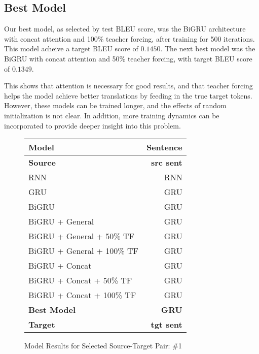 \documentclass[twoside,twocolumn]{article}
\begin{document}
\subsection{Best Model}
Our best model, as selected by test BLEU score, was the BiGRU architecture
with concat attention and 100\% teacher forcing, after training for 500
iterations. This model acheive a target BLEU score of $0.1450$. The next best
model was the BiGRU with concat attention and 50\% teacher forcing, with target
BLEU score of $0.1349$.

This shows that attention is necessary for good results, and that teacher
forcing helps the model achieve better translations by feeding in the true
target tokens. However, these models can be trained longer, and the effects
of random initialization is not clear. In addition, more training dynamics can
be incorporated to provide deeper insight into this problem.

\label{sec:results}

\begin{figure*}
    \centering
    \begin{tabular}{ |l|r| }
        \hline
        \textbf{Model}
          & \textbf{Sentence} \\
        \hline
        \textbf{Source} & \textbf{src sent} \\ \hline
        RNN & RNN \\ \hline
        GRU & GRU \\ \hline
        BiGRU & GRU \\ \hline
        BiGRU + General & GRU \\ \hline
        BiGRU + General + 50\% TF & GRU \\ \hline
        BiGRU + General + 100\% TF & GRU \\ \hline
        BiGRU + Concat & GRU \\ \hline
        BiGRU + Concat + 50\% TF & GRU \\ \hline
        BiGRU + Concat + 100\% TF & GRU \\ \hline
        \textbf{Best Model} & \textbf{GRU} \\ \hline
        \textbf{Target} & \textbf{tgt sent} \\ \hline
    \end{tabular}

    \caption{Model Results for Selected Source-Target Pair: \#1}
    \label{fig:model-results}
\end{figure*}
\end{document}

